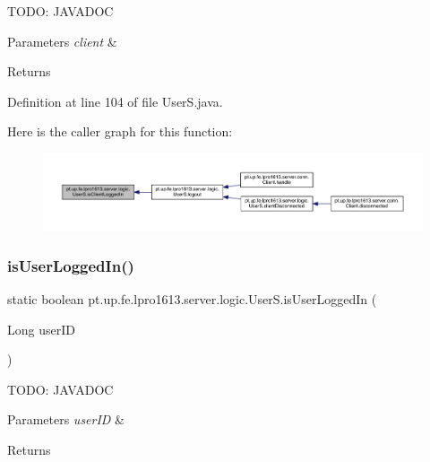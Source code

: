 T\+O\+DO\+: J\+A\+V\+A\+D\+OC 
\begin{DoxyParams}{Parameters}
{\em client} & \\
\hline
\end{DoxyParams}
\begin{DoxyReturn}{Returns}

\end{DoxyReturn}


Definition at line 104 of file User\+S.\+java.

Here is the caller graph for this function\+:
\nopagebreak
\begin{figure}[H]
\begin{center}
\leavevmode
\includegraphics[width=350pt]{classpt_1_1up_1_1fe_1_1lpro1613_1_1server_1_1logic_1_1_user_s_abe3cf61bff09cb09e3ed0a5564e98257_icgraph}
\end{center}
\end{figure}
\hypertarget{classpt_1_1up_1_1fe_1_1lpro1613_1_1server_1_1logic_1_1_user_s_af0725775fa11525afa9299d198d69b2a}{}\label{classpt_1_1up_1_1fe_1_1lpro1613_1_1server_1_1logic_1_1_user_s_af0725775fa11525afa9299d198d69b2a} 
\subsubsection{\texorpdfstring{is\+User\+Logged\+In()}{isUserLoggedIn()}}
{\footnotesize\ttfamily static boolean pt.\+up.\+fe.\+lpro1613.\+server.\+logic.\+User\+S.\+is\+User\+Logged\+In (\begin{DoxyParamCaption}\item[{Long}]{user\+ID }\end{DoxyParamCaption})\hspace{0.3cm}{\ttfamily [static]}}

T\+O\+DO\+: J\+A\+V\+A\+D\+OC 
\begin{DoxyParams}{Parameters}
{\em user\+ID} & \\
\hline
\end{DoxyParams}
\begin{DoxyReturn}{Returns}

\end{DoxyReturn}


